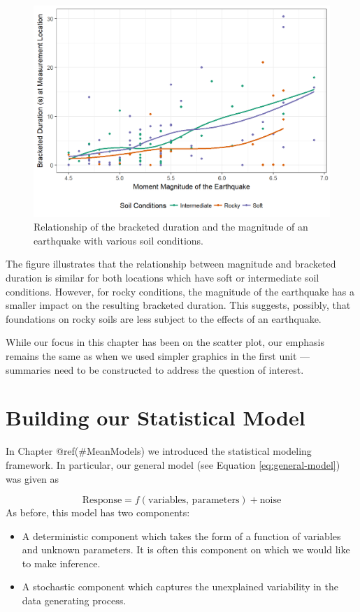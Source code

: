 \documentclass[]{book}
\providecommand{\tightlist}{%
  \setlength{\itemsep}{0pt}\setlength{\parskip}{0pt}}
\theoremstyle{plain}
\theoremstyle{mydefn}
\theoremstyle{myexmpl}
\theoremstyle{remark}
\begin{document}
\begin{figure}

{\centering \includegraphics[width=0.8\linewidth]{./Images/regsummaries-color-1} 

}

\caption{Relationship of the bracketed duration and the magnitude of an earthquake with various soil conditions.}\label{fig:regsummaries-color}
\end{figure}

The figure illustrates that the relationship between magnitude and
bracketed duration is similar for both locations which have soft or
intermediate soil conditions. However, for rocky conditions, the
magnitude of the earthquake has a smaller impact on the resulting
bracketed duration. This suggests, possibly, that foundations on rocky
soils are less subject to the effects of an earthquake.

While our focus in this chapter has been on the scatter plot, our
emphasis remains the same as when we used simpler graphics in the first
unit --- summaries need to be constructed to address the question of
interest.

\chapter{Building our Statistical Model}\label{Regmodel}

In Chapter @ref(\#MeanModels) we introduced the statistical modeling
framework. In particular, our general model (see Equation
\eqref{eq:general-model}) was given as

\[\text{Response} = f(\text{variables, parameters}) + \text{noise}\] As
before, this model has two components:

\begin{itemize}
\tightlist
\item
  A deterministic component which takes the form of a function of
  variables and unknown parameters. It is often this component on which
  we would like to make inference.
\item
  A stochastic component which captures the unexplained variability in
  the data generating process.
\end{itemize}
\end{document}
